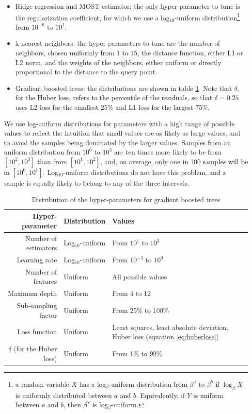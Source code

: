 \documentclass[a4paper,11pt]{kth-mag}
\begin{document}
\begin{itemize}
\item Ridge regression and MOST estimator: the only hyper-parameter to tune is the regularization coefficient, for which we use a log$_{10}$-uniform distribution\footnote{a random variable $X$ has a log$_\beta$-uniform distribution from $\beta^a$ to $\beta^b$ if $\log_\beta X$ is uniformly distributed between $a$ and $b$. Equivalently, if $Y$ is uniform between $a$ and $b$, then $\beta^Y$ is log$_\beta$-uniform.} from $10^{-6}$ to $10^{1}$.

\item k-nearest neighbors: the hyper-parameters to tune are the number of neighbors, chosen uniformly from $1$ to $15$, the distance function, either L1 or L2 norm, and the weights of the neighbors, either uniform or directly proportional to the distance to the query point.

\item Gradient boosted trees: the distributions are shown in table \ref{tbl:gb_hyperparams}. Note that $\delta$, for the Huber loss, refers to the percentile of the residuals, so that $\delta=0.25$ uses L2 loss for the smallest 25\% and L1 loss for the largest 75\%.
\end{itemize}

We use log-uniform distributions for parameters with a high range of possible values to reflect the intuition that small values are as likely as large values, and to avoid the samples being dominated by the larger values. Samples from an uniform distribution from $10^0$ to $10^3$ are ten times more likely to be from $[10^2,10^3]$ than from $[10^1,10^2]$, and, on average, only one in 100 samples will be in $[10^0,10^1]$. Log$_{10}$-uniform distributions do not have this problem, and a sample is equally likely to belong to any of the three intervals.

\begin{table}[]
\centering
\caption{Distribution of the hyper-parameters for gradient boosted trees}
\label{tbl:gb_hyperparams}
\begin{tabularx}{\textwidth}{r|l|X}
\toprule
\textbf{Hyper-parameter} & \textbf{Distribution} & \textbf{Values} \\ \midrule
Number of estimators & Log$_{10}$-uniform & From $10^1$ to $10^3$ \\
Learning rate & Log$_{10}$-uniform & From $10^{-3}$ to $10^0$ \\
Number of features & Uniform & All possible values \\
Maximum depth & Uniform & From 4 to 12 \\
Sub-sampling factor & Uniform & From 25\% to 100\% \\
Loss function & Uniform & Least squares, least absolute deviation, \newline Huber loss (equation \ref{eq:huberloss}) \\
$\delta$ (for the Huber loss) & Uniform & From 1\% to 99\% \\
\bottomrule
\end{tabularx}
\end{table}
\end{document}
